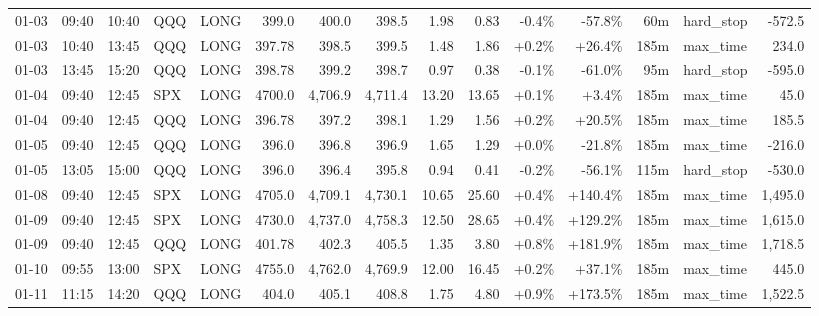 \documentclass[11pt,a4paper,twoside]{article}
\begin{document}
\begin{landscape}
\begin{center}
\begin{longtable}{>{\color{txtmain}}l l l l l r r r r r r r r >{\color{txtmain}}l r}
01-03 & 09:40 & 10:40 & QQQ & LONG & 399.0 & 400.0 & 398.5 & 1.98 & 0.83 & \textcolor{lossred}{-0.4\%} & \textcolor{lossred}{-57.8\%} & 60m & hard\_stop & \textcolor{lossred}{-572.5} \\
01-03 & 10:40 & 13:45 & QQQ & LONG & 397.78 & 398.5 & 399.5 & 1.48 & 1.86 & \textcolor{wingreen}{+0.2\%} & \textcolor{wingreen}{+26.4\%} & 185m & max\_time & \textcolor{wingreen}{234.0} \\
01-03 & 13:45 & 15:20 & QQQ & LONG & 398.78 & 399.2 & 398.7 & 0.97 & 0.38 & \textcolor{lossred}{-0.1\%} & \textcolor{lossred}{-61.0\%} & 95m & hard\_stop & \textcolor{lossred}{-595.0} \\
01-04 & 09:40 & 12:45 & SPX & LONG & 4700.0 & 4,706.9 & 4,711.4 & 13.20 & 13.65 & \textcolor{wingreen}{+0.1\%} & \textcolor{wingreen}{+3.4\%} & 185m & max\_time & \textcolor{wingreen}{45.0} \\
01-04 & 09:40 & 12:45 & QQQ & LONG & 396.78 & 397.2 & 398.1 & 1.29 & 1.56 & \textcolor{wingreen}{+0.2\%} & \textcolor{wingreen}{+20.5\%} & 185m & max\_time & \textcolor{wingreen}{185.5} \\
01-05 & 09:40 & 12:45 & QQQ & LONG & 396.0 & 396.8 & 396.9 & 1.65 & 1.29 & \textcolor{wingreen}{+0.0\%} & \textcolor{lossred}{-21.8\%} & 185m & max\_time & \textcolor{lossred}{-216.0} \\
01-05 & 13:05 & 15:00 & QQQ & LONG & 396.0 & 396.4 & 395.8 & 0.94 & 0.41 & \textcolor{lossred}{-0.2\%} & \textcolor{lossred}{-56.1\%} & 115m & hard\_stop & \textcolor{lossred}{-530.0} \\
01-08 & 09:40 & 12:45 & SPX & LONG & 4705.0 & 4,709.1 & 4,730.1 & 10.65 & 25.60 & \textcolor{wingreen}{+0.4\%} & \textcolor{wingreen}{+140.4\%} & 185m & max\_time & \textcolor{wingreen}{1,495.0} \\
01-09 & 09:40 & 12:45 & SPX & LONG & 4730.0 & 4,737.0 & 4,758.3 & 12.50 & 28.65 & \textcolor{wingreen}{+0.4\%} & \textcolor{wingreen}{+129.2\%} & 185m & max\_time & \textcolor{wingreen}{1,615.0} \\
01-09 & 09:40 & 12:45 & QQQ & LONG & 401.78 & 402.3 & 405.5 & 1.35 & 3.80 & \textcolor{wingreen}{+0.8\%} & \textcolor{wingreen}{+181.9\%} & 185m & max\_time & \textcolor{wingreen}{1,718.5} \\
01-10 & 09:55 & 13:00 & SPX & LONG & 4755.0 & 4,762.0 & 4,769.9 & 12.00 & 16.45 & \textcolor{wingreen}{+0.2\%} & \textcolor{wingreen}{+37.1\%} & 185m & max\_time & \textcolor{wingreen}{445.0} \\
01-11 & 11:15 & 14:20 & QQQ & LONG & 404.0 & 405.1 & 408.8 & 1.75 & 4.80 & \textcolor{wingreen}{+0.9\%} & \textcolor{wingreen}{+173.5\%} & 185m & max\_time & \textcolor{wingreen}{1,522.5} \\

\end{longtable}
\end{center}
\end{landscape}
\end{document}
